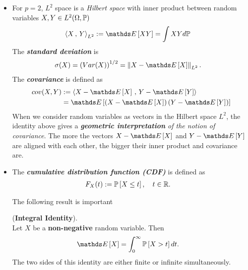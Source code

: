 \documentclass[11pt]{article}
\begin{document}
\begin{itemize}
\item For $p=2$, $L^2$ space is a \emph{Hilbert space} with inner product between random variables $X, Y \in L^2(\Omega, {\mathbb P})$
\begin{align*}
\inn{X}{Y}_{L^2} &:= \E{}{XY} = \int X Y d\bP
\end{align*} The \emph{\textbf{standard deviation}} is 
\begin{align*}
\sigma(X) &= \paren{Var(X) }^{1/2} = \norm{X - \E{}{X}}{L^2}.
\end{align*} The \emph{\textbf{covariance}} is defined as 
\begin{align*}
cov(X, Y) &:= \inn{X- \E{}{X}}{Y - \E{}{Y}} \\
&= \E{}{\paren{X- \E{}{X}}\paren{Y - \E{}{Y}}}
\end{align*} When we consider random variables as vectors in the Hilbert space $L^2$, the identity above gives a \emph{\textbf{geometric interpretation} of the notion of covariance}. The more the vectors $X - \E{}{X}$ and $Y - \E{}{Y}$ are aligned with each other, the bigger their inner product and covariance are.

\item The \emph{\textbf{cumulative distribution function (CDF)}} is defined as
\begin{align*}
F_{X}(t) &:= {\mathbb P}\left[X \le t\right], \quad t\in {\mathbb R}.
\end{align*}

The following result is important 
\begin{lemma} (\textbf{Integral Identity}).  \citep{vershynin2018high}\\
Let $X$ be a \textbf{non-negative} random variable.
Then
\begin{align}
\E{}{X} &= \int_{0}^{\infty}\bP\brac{X > t} dt. \label{eqn: integral_identity}
\end{align}
The two sides of this identity are either finite or infinite simultaneously.
\end{lemma}
\end{itemize}
\end{document}

